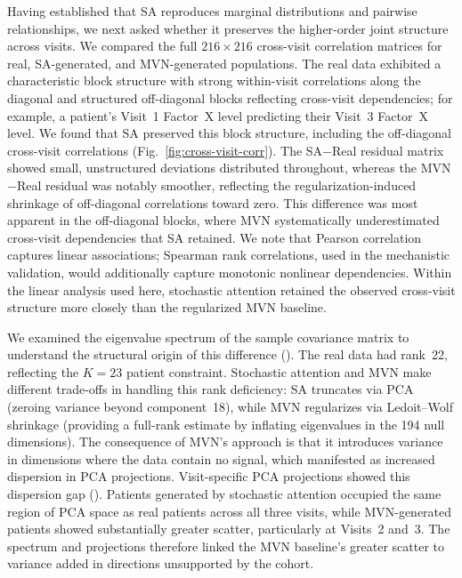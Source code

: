 Having established that SA reproduces marginal distributions and pairwise
relationships, we next asked whether it preserves the higher-order joint structure
across visits. We compared the full $216 \times 216$ cross-visit correlation matrices for real,
SA-generated, and MVN-generated populations. The real data exhibited a characteristic
block structure with strong within-visit correlations along the diagonal and
structured off-diagonal blocks reflecting cross-visit dependencies; for example,
a patient's Visit~1 Factor~X level predicting their Visit~3 Factor~X level. We found
that SA preserved this block structure, including the off-diagonal cross-visit
correlations (Fig.~\ref{fig:cross-visit-corr}). The SA$-$Real residual matrix showed
small, unstructured deviations distributed throughout, whereas the MVN$-$Real residual
was notably smoother, reflecting the regularization-induced shrinkage of off-diagonal
correlations toward zero. This difference was most apparent in the off-diagonal blocks,
where MVN systematically underestimated cross-visit dependencies that SA retained.
We note that Pearson correlation captures linear associations; Spearman rank
correlations, used in the mechanistic validation, would additionally capture
monotonic nonlinear dependencies. Within the linear analysis used here, stochastic attention
retained the observed cross-visit structure more closely than the regularized MVN baseline.

We examined the eigenvalue spectrum of the sample covariance matrix to understand the
structural origin of this difference (). The real data had
rank~22, reflecting the $K{=}23$ patient constraint. Stochastic attention and MVN make different
trade-offs in handling this rank deficiency: SA truncates via PCA (zeroing variance
beyond component~18), while MVN regularizes via Ledoit--Wolf shrinkage (providing a
full-rank estimate by inflating eigenvalues in the 194 null dimensions). The
consequence of MVN's approach is that it introduces variance in dimensions where the
data contain no signal, which manifested as increased dispersion in PCA projections.
Visit-specific PCA projections showed this dispersion gap ().
Patients generated by stochastic attention occupied the same region of PCA space as real
patients across all three visits, while MVN-generated patients showed substantially greater scatter,
particularly at Visits~2 and~3. The spectrum and projections therefore linked the MVN
baseline's greater scatter to variance added in directions unsupported by the cohort.

